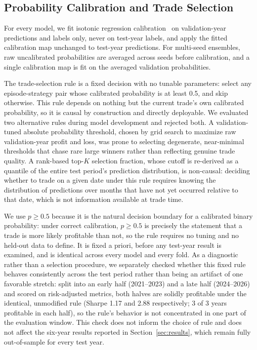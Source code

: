 \documentclass[sigconf,review,anonymous]{acmart}
\begin{document}
\subsection{Probability Calibration and Trade Selection}
\label{sec:calibration}
For every model, we fit isotonic regression calibration~\cite{zadrozny2002transforming} on validation-year predictions and labels only, never on test-year labels, and apply the fitted calibration map unchanged to test-year predictions. For multi-seed ensembles, raw uncalibrated probabilities are averaged across seeds before calibration, and a single calibration map is fit on the averaged validation probabilities.

The trade-selection rule is a fixed decision with no tunable parameters: select any episode-strategy pair whose calibrated probability is at least 0.5, and skip otherwise. This rule depends on nothing but the current trade's own calibrated probability, so it is causal by construction and directly deployable. We evaluated two alternative rules during model development and rejected both. A validation-tuned absolute probability threshold, chosen by grid search to maximize raw validation-year profit and loss, was prone to selecting degenerate, near-minimal thresholds that chase rare large winners rather than reflecting genuine trade quality. A rank-based top-$K$ selection fraction, whose cutoff is re-derived as a quantile of the entire test period's prediction distribution, is non-causal: deciding whether to trade on a given date under this rule requires knowing the distribution of predictions over months that have not yet occurred relative to that date, which is not information available at trade time.

We use $p \ge 0.5$ because it is the natural decision boundary for a calibrated binary probability: under correct calibration, $p \ge 0.5$ is precisely the statement that a trade is more likely profitable than not, so the rule requires no tuning and no held-out data to define. It is fixed a priori, before any test-year result is examined, and is identical across every model and every fold. As a diagnostic rather than a selection procedure, we separately checked whether this fixed rule behaves consistently across the test period rather than being an artifact of one favorable stretch: split into an early half (2021--2023) and a late half (2024--2026) and scored on risk-adjusted metrics, both halves are solidly profitable under the identical, unmodified rule (Sharpe 1.17 and 2.88 respectively; 3 of 3 years profitable in each half), so the rule's behavior is not concentrated in one part of the evaluation window. This check does not inform the choice of rule and does not affect the six-year results reported in Section~\ref{sec:results}, which remain fully out-of-sample for every test year.
\end{document}
